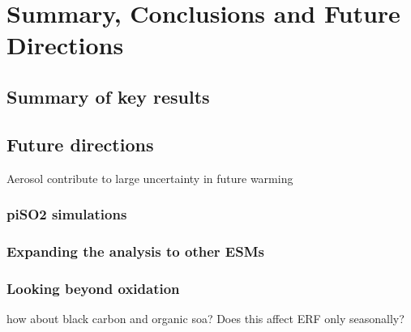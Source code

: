 \chapter{Summary, Conclusions and Future Directions}
\ifpdf
    \graphicspath{{Chapter6/Figs/Raster/}{Chapter6/Figs/PDF/}{Chapter6/Figs/}}
\else
    \graphicspath{{Chapte6/Figs/Vector/}{Chapter6/Figs/}}
\fi


\section{Summary of key results}

\section{Future directions}

Aerosol contribute to large uncertainty in future warming \citep{watson-parrisLargeUncertaintyFuture2022,wilcoxRegionalAerosolModel2022}

\subsection{piSO2 simulations}

\subsection{Expanding the analysis to other ESMs}

\subsection{Looking beyond \texorpdfstring{}{SO2} oxidation}
how about black carbon and organic soa? Does this affect ERF only seasonally? \citep{bellouinRegionalSeasonalRadiative2016}


